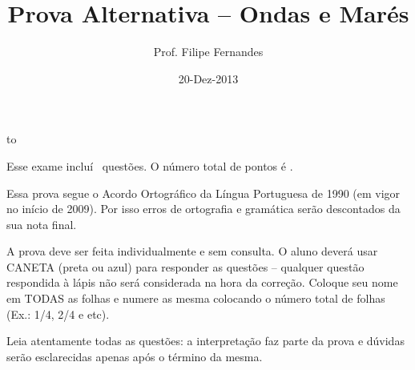 \documentclass[letterpaper,portuguese,12pt,pdftex]{exam}
\title{Prova Alternativa -- Ondas e Marés}
\author{Prof. Filipe Fernandes}
\date{20-Dez-2013}
\begin{document}
\maketitle
\doublespacing

\vspace{2cm}
\hbox to \textwidth{Nome e número de matrícula:\enspace\hrulefill}
\vspace{2cm}

\begin{minipage}{.8\textwidth}
Esse exame incluí \numquestions\ questões. O número total de pontos é \numpoints.
\vspace{1cm}

Essa prova segue o Acordo Ortográfico da Língua Portuguesa de 1990 (em vigor no
início de 2009).  Por isso erros de ortografia e gramática serão descontados da
sua nota final.

\vspace{1cm}

A prova deve ser feita individualmente e sem consulta.  O aluno deverá usar
CANETA (preta ou azul) para responder as questões – qualquer questão respondida
à lápis não será considerada na hora da correção.  Coloque seu nome em TODAS as
folhas e numere as mesma colocando o número total de folhas (Ex.: 1/4, 2/4 e
etc).

\vspace{1cm}

Leia atentamente todas as questões: a interpretação faz parte da prova e dúvidas
serão esclarecidas apenas após o término da mesma.

\end{minipage}

\clearpage
\end{document}

